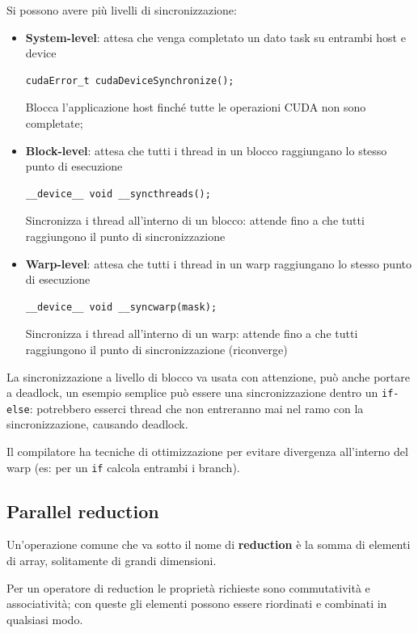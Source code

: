 Si possono avere più livelli di sincronizzazione:
\begin{itemize}
	\item \textbf{System-level}: attesa che venga completato un dato task su entrambi host e device
	\begin{verbatim}
cudaError_t cudaDeviceSynchronize();
	\end{verbatim}
	Blocca l'applicazione host finché tutte le operazioni CUDA non sono completate;
	
	\item \textbf{Block-level}: attesa che tutti i thread in un blocco raggiungano lo stesso punto di esecuzione
	\begin{verbatim}
__device__ void __syncthreads();
	\end{verbatim}
	Sincronizza i thread all'interno di un blocco: attende fino a che tutti raggiungono il punto di sincronizzazione
	
	\item \textbf{Warp-level}: attesa che tutti i thread in un warp raggiungano lo stesso punto di esecuzione
	\begin{verbatim}
__device__ void __syncwarp(mask);
	\end{verbatim}
	Sincronizza i thread all'interno di un warp: attende fino a che tutti raggiungono il punto di sincronizzazione (riconverge)
\end{itemize}

La sincronizzazione a livello di blocco va usata con attenzione, può anche portare a deadlock, un esempio semplice può essere una sincronizzazione dentro un \texttt{if-else}: potrebbero esserci thread che non entreranno mai nel ramo con la sincronizzazione, causando deadlock.

Il compilatore ha tecniche di ottimizzazione per evitare divergenza all'interno del warp (es: per un \texttt{if} calcola entrambi i branch).

\subsection{Parallel reduction}

Un'operazione comune che va sotto il nome di \textbf{reduction} è la somma di elementi di array, solitamente di grandi dimensioni. 

Per un operatore di reduction le proprietà richieste sono commutatività e associatività; con queste gli elementi possono essere riordinati e combinati in qualsiasi modo.

